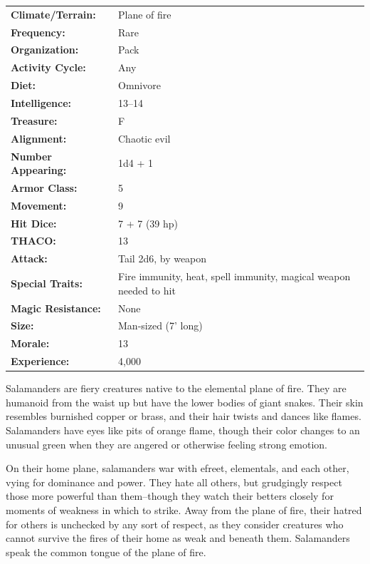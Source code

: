 \begin{multicols}{2}
\begin{minipage}{\columnwidth}
\noindent \begin{tabular}{p{}p{}}
\textbf{Climate/Terrain:}	& Plane of fire	\\
\textbf{Frequency:} 		& Rare	\\
\textbf{Organization:} 		& Pack	\\
\textbf{Activity Cycle:} 	& Any	\\
\textbf{Diet:} 				& Omnivore	\\
\textbf{Intelligence:} 		& 13--14	\\
\textbf{Treasure:} 			& F	\\
\textbf{Alignment:} 		& Chaotic evil	\\
\hline
\textbf{Number Appearing:} 	& 1d4 + 1	\\
\textbf{Armor Class:} 		& 5	\\
\textbf{Movement:} 			& 9	\\
\textbf{Hit Dice:} 			& 7 + 7 (39 hp)	\\
\textbf{THACO:} 			& 13	\\
\textbf{Attack:} 			& Tail 2d6, by weapon	\\
\textbf{Special Traits:} & Fire immunity, heat, spell immunity, magical weapon needed to hit	\\
\textbf{Magic Resistance:} 	& None	\\
\textbf{Size:} 				& Man-sized (7' long)	\\
\textbf{Morale:} 			& 13	\\
\textbf{Experience:} 		& 4,000	\\ %
\end{tabular}

\end{minipage}

Salamanders are fiery creatures native to the elemental plane of fire. They are humanoid from the waist up but have the lower bodies of giant snakes. Their skin resembles burnished copper or brass, and their hair twists and dances like flames. Salamanders have eyes like pits of orange flame, though their color changes to an unusual green when they are angered or otherwise feeling strong emotion.

On their home plane, salamanders war with efreet, elementals, and each other, vying for dominance and power. They hate all others, but grudgingly respect those more powerful than them--though they watch their betters closely for moments of weakness in which to strike. Away from the plane of fire, their hatred for others is unchecked by any sort of respect, as they consider creatures who cannot survive the fires of their home as weak and beneath them. Salamanders speak the common tongue of the plane of fire.


\end{multicols}
